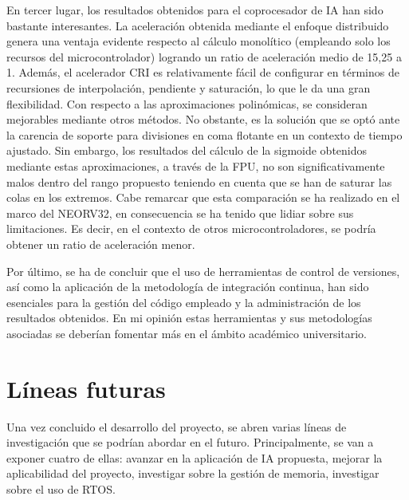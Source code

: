 En tercer lugar, los resultados obtenidos para el coprocesador de IA han sido bastante interesantes.
La aceleración obtenida mediante el enfoque distribuido genera una ventaja evidente respecto al cálculo monolítico (empleando solo los recursos del microcontrolador) logrando un ratio de aceleración medio de 15,25 a 1.
Además, el acelerador CRI es relativamente fácil de configurar en términos de recursiones de interpolación, pendiente y saturación, lo que le da una gran flexibilidad.
Con respecto a las aproximaciones polinómicas, se consideran mejorables mediante otros métodos.
No obstante, es la solución que se optó ante la carencia de soporte para divisiones en coma flotante en un contexto de tiempo ajustado. 
Sin embargo, los resultados del cálculo de la sigmoide obtenidos mediante estas aproximaciones, a través de la FPU, no son significativamente malos dentro del rango propuesto teniendo en cuenta que se han de saturar las colas en los extremos.
Cabe remarcar que esta comparación se ha realizado en el marco del NEORV32, en consecuencia se ha tenido que lidiar sobre sus limitaciones.
Es decir, en el contexto de otros microcontroladores, se podría obtener un ratio de aceleración menor.

Por último, se ha de concluir que el uso de herramientas de control de versiones, así como la aplicación de la metodología de integración continua, han sido esenciales para la gestión del código empleado y la administración de los resultados obtenidos.
En mi opinión estas herramientas y sus metodologías asociadas se deberían fomentar más en el ámbito académico universitario.

\section{Líneas futuras}

\label{lin-fut}

Una vez concluido el desarrollo del proyecto, se abren varias líneas de investigación que se podrían abordar en el futuro.
Principalmente, se van a exponer cuatro de ellas: avanzar en la aplicación de IA propuesta, mejorar la aplicabilidad del proyecto, investigar sobre la gestión de memoria, investigar sobre el uso de RTOS.

